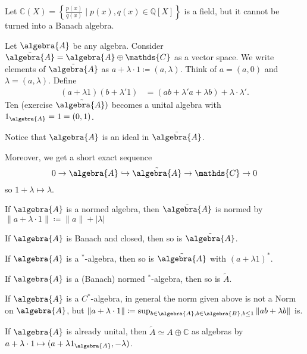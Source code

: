 \documentclass[a4paper]{article}
\begin{document}
\begin{corollary}
	Let $\mathds{C}(X) = \left\{ \frac{p(x)}{q(x)} \mid p(x), q(x) \in \mathds{Q}[X] \right\}$ is a field, but it cannot be turned into a Banach algebra.
\end{corollary}

\begin{theorem}
	Let $\algebra{A}$ be any algebra.
	Consider $\tilde{ \algebra{A}} = \algebra{A} \oplus \mathds{C}$ as a vector space.
	We write elements of $\tilde{\algebra{A}}$ as $a + \lambda \cdot 1 \coloneq (a, \lambda)$. Think of $a = (a,0)$ and $\lambda = (a, \lambda)$.
	Define
	\begin{align*}
		(a + \lambda 1) (b + \lambda' 1) & = (ab + \lambda' a + \lambda b) + \lambda \cdot \lambda'\text{.}
	\end{align*}
	Ten (exercise $\tilde{\algebra{A})}$ becomes a unital algebra with $1_\algebra{A} = 1 = (0,1)$.

	Notice that $\algebra{A}$ is an ideal in $\tilde{\algebra{A}}$.

	Moreover, we get a short exact sequence
	\begin{equation*}
		0 \to \algebra{A} \hookrightarrow \tilde{\algebra{A}} \to \mathds{C} \to 0
	\end{equation*}
	so $1 + \lambda \mapsto \lambda$.

	If $\algebra{A}$ is a normed algebra, then $\tilde{\algebra{A}}$ is normed by $\|a + \lambda \cdot 1\| \coloneq \|a\| + |\lambda|$

	If $\algebra{A}$ is Banach and closed, then so is $\tilde{\algebra{A}}$.

	If $\algebra{A}$ is a $^*$-algebra, then so is $\tilde{\algebra{A}}$ with $(a + \lambda 1)^*$.

	If $\algebra{A}$ is a (Banach) normed $^*$-algebra, then so is $\tilde A$.

	If $\algebra{A}$ is a $C^*$-algebra, in general the norm given above is not a Norm on $\algebra{A}$, but $\|a + \lambda \cdot 1\| \coloneq \sup_{b \in \algebra{A}, b \in \algebra{B}, b \leq 1} \|a b + \lambda b\|$ is.
\end{theorem}

\begin{exercise}\label{exe:AplusC}
	If $\algebra{A}$ is already unital, then $\tilde A \simeq A \oplus \mathds{C}$ as algebras by $a + \lambda \cdot 1 \mapsto (a + \lambda 1_\algebra{A}, -\lambda) $.
\end{exercise}
\end{document}
